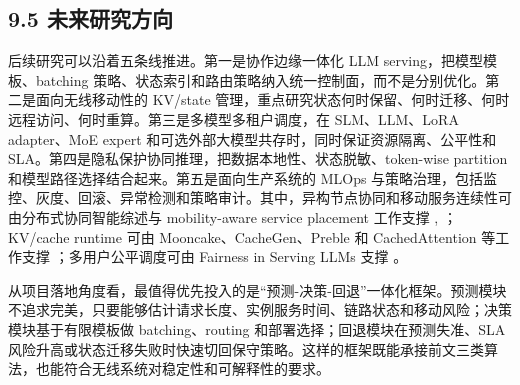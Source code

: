 \subsection*{9.5 未来研究方向}

后续研究可以沿着五条线推进。第一是协作边缘一体化 LLM serving，把模型模板、batching 策略、状态索引和路由策略纳入统一控制面，而不是分别优化。第二是面向无线移动性的 KV/state 管理，重点研究状态何时保留、何时迁移、何时远程访问、何时重算。第三是多模型多租户调度，在 SLM、LLM、LoRA adapter、MoE expert 和可选外部大模型共存时，同时保证资源隔离、公平性和 SLA。第四是隐私保护协同推理，把数据本地性、状态脱敏、token-wise partition 和模型路径选择结合起来。第五是面向生产系统的 MLOps 与策略治理，包括监控、灰度、回滚、异常检测和策略审计。其中，异构节点协同和移动服务连续性可由分布式协同智能综述与 mobility-aware service placement 工作支撑 \cite{duan2022distributed}, \cite{ouyang2018follow}；KV/cache runtime 可由 Mooncake、CacheGen、Preble 和 CachedAttention 等工作支撑 \cite{qin2025mooncake,liu2024cachegen,srivatsa2025preble,gao2024cost}；多用户公平调度可由 Fairness in Serving LLMs 支撑 \cite{sheng2024fairness}。

从项目落地角度看，最值得优先投入的是“预测-决策-回退”一体化框架。预测模块不追求完美，只要能够估计请求长度、实例服务时间、链路状态和移动风险；决策模块基于有限模板做 batching、routing 和部署选择；回退模块在预测失准、SLA 风险升高或状态迁移失败时快速切回保守策略。这样的框架既能承接前文三类算法，也能符合无线系统对稳定性和可解释性的要求。
